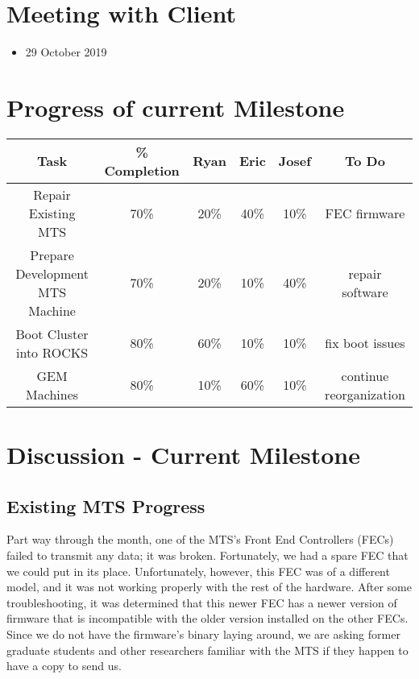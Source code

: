 \documentclass[12pt]{article}
\newcommand\tab[1][1cm]{\hspace*{#1}}
\begin{document}
\section{Meeting with Client}

\begin{itemize}
\item[] 29 October 2019
\end{itemize}

\section{Progress of current Milestone}

\begin{adjustwidth}{-2cm}{}
  \begin{center}
    \begin{tabular}{|c|c|c|c|c|c|}
      \hline
      Task & \% Completion & Ryan & Eric & Josef & To Do \\
      \hline
      Repair Existing MTS & 70\% & 20\% & 40\% & 10\% & FEC firmware \\
      Prepare Development MTS Machine & 70\% & 20\% & 10\% & 40\% & repair
                                                                    software \\
      Boot Cluster into ROCKS & 80\% & 60\% & 10\% & 10\% & fix boot issues \\
      GEM Machines & 80\% & 10\% & 60\% & 10\% & continue reorganization \\
      \hline   
    \end{tabular}
  \end{center}
\end{adjustwidth}

\section{Discussion - Current Milestone}

\subsection{Existing MTS Progress}

\tab Part way through the month, one of the MTS's Front End Controllers (FECs)
failed to transmit any data; it was broken. Fortunately, we had a spare FEC that
we could put in its place. Unfortunately, however, this FEC was of a different
model, and it was not working properly with the rest of the hardware. After some
troubleshooting, it was determined that this newer FEC has a newer version of
firmware that is incompatible with the older version installed on the other
FECs. Since we do not have the firmware's binary laying around, we are asking
former graduate students and other researchers familiar with the MTS if they
happen to have a copy to send us. 
\end{document}
